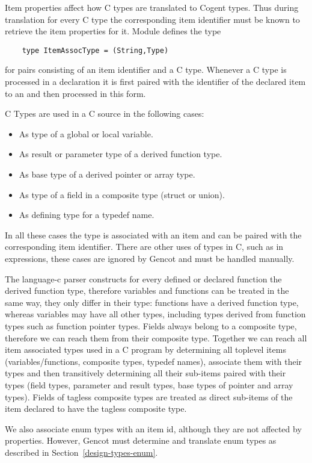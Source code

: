 Item properties affect how C types are translated to Cogent types. Thus during translation for every C
type the corresponding item identifier must be known to retrieve the item properties for it. Module
 defines the type 
\begin{verbatim}
    type ItemAssocType = (String,Type)
\end{verbatim}
for pairs consisting of an item identifier and a C type. Whenever a C type is processed in a declaration
it is first paired with the identifier of the declared item to an  and then processed in
this form. 

C Types are used in a C source in the following cases:
\begin{itemize}
\item As type of a global or local variable.
\item As result or parameter type of a derived function type.
\item As base type of a derived pointer or array type.
\item As type of a field in a composite type (struct or union).
\item As defining type for a typedef name.
\end{itemize}
In all these cases the type is associated with an item and can be paired with the corresponding item identifier.
There are other uses of types in C, such as in  expressions, these cases are ignored by Gencot and 
must be handled manually.

The language-c
parser constructs for every defined or declared function the derived function type, therefore variables and functions
can be treated in the same way, they only differ in their type: functions have a derived function type, whereas
variables may have all other types, including types derived from function types such as function pointer types. Fields 
always belong to a composite type, therefore we can reach them from their composite type.
Together we can reach all item associated types used in a C program by determining all toplevel items (variables/functions, 
composite types, typedef names), associate them with their types and then transitively determining all their sub-items 
paired with their types (field types, parameter and result types, base types of pointer and array types). Fields
of tagless composite types are treated as direct sub-items of the item declared to have the tagless composite type.

We also associate enum types with an item id, although they are not affected by properties. However, Gencot must determine 
and translate enum types as described in Section~\ref{design-types-enum}.

